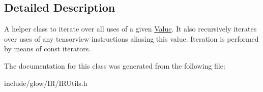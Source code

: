 \subsection{Detailed Description}
A helper class to iterate over all uses of a given \hyperlink{classglow_1_1_value}{Value}. It also recursively iterates over uses of any tensorview instructions aliasing this value. Iteration is performed by means of const iterators. 

The documentation for this class was generated from the following file\+:\begin{DoxyCompactItemize}
\item 
include/glow/\+I\+R/I\+R\+Utils.\+h\end{DoxyCompactItemize}

